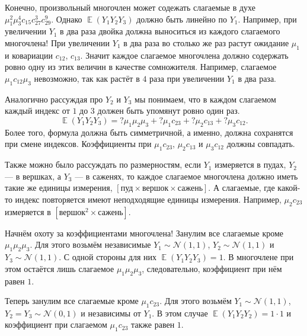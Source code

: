 \documentclass[12pt]{article}
\DeclareMathOperator{\E}{\mathbb{E}}
\newcommand{\cN}{\mathcal{N}}
\begin{document}
Конечно, произвольный многочлен может содежать слагаемые в духе $\mu_1^2 \mu_3^4 c_{15} c_{27}^3 c_{29}^9$.
Однако $\E(Y_1 Y_2 Y_3)$ должно быть линейно по $Y_1$. 
Например, при увеличении $Y_1$ в два раза двойка должна выноситься из каждого слагаемого многочлена!
При увеличении $Y_1$ в два раза во столько же раз растут ожидание $\mu_1$ и ковариации $c_{12}$, $c_{13}$.
Значит каждое слагаемое многочлена должно содержать ровно одну из этих величин в качестве сомножителя.
Например, слагаемое $\mu_1 c_{12} \mu_3$ невозможно, так как растёт в $4$ раза при увеличении $Y_1$ в два раза.

Аналогично рассуждая про $Y_2$ и $Y_3$ мы понимаем, что в каждом слагаемом каждый индекс от $1$ до $3$ должен быть упомянут ровно один раз.
\[
\E(Y_1 Y_2 Y_3) = ? \mu_1 \mu_2 \mu_3 + ? \mu_1 c_{23} + ? \mu_2 c_{13} + ? \mu_3 c_{12}.
\]
Более того, формула должна быть симметричной, а именно, должна сохранятся при смене индексов. 
Коэффициенты при $\mu_1 c_{23}$, $\mu_2 c_{13}$ и $\mu_3 c_{12}$ должны совпадать.

Также можно было рассуждать по размерностям, если $Y_1$ измеряется в пудах, $Y_2$ — в вершках, а $Y_3$ — в саженях, 
то каждое слагаемое многочлена должно иметь такие же единицы измерения, $[\text{пуд}\times \text{вершок} \times\text{сажень}]$. 
А слагаемые, где какой-то индекс повторяется имеют неподходящие единицы измерения. 
Например, $\mu_2 c_{23}$ измеряется в $[\text{вершок}^2 \times\text{сажень}]$. 

Начнём охоту за коэффициентами многочлена! Занулим все слагаемые кроме $\mu_1 \mu_2 \mu_3$.
Для этого возьмём независимые $Y_1 \sim \cN(1, 1)$, $Y_2\sim \cN(1, 1)$ и $Y_3\sim \cN(1, 1)$.
С одной стороны для них $\E(Y_1 Y_2 Y_3) = 1$. 
В многочлене при этом остаётся лишь слагаемое $\mu_1 \mu_2 \mu_3$,
следовательно, коэффициент при нём равен $1$.

Теперь занулим все слагаемые кроме $\mu_1 c_{23}$.
Для этого возьмём $Y_1 \sim \cN(1, 1)$, $Y_2 = Y_3 \sim \cN(0, 1)$ и независимы от $Y_1$.
В этом случае $\E(Y_1 Y_2 Y_2) = 1 \cdot 1$ и коэффициент при слагаемом $\mu_1 c_{23}$ также равен $1$.
\end{document}

